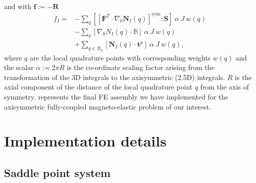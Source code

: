 and with $\mathbf{f} := -\mathbf{R}$
\begin{align}
f_I = &- \sum\limits_q \left[ \left[ \mathbf{F}^T \cdot \nabla_0 \mathbf{N}_I (q) \right]^{\text{sym}} : \mathbf{S} \right] \ \alpha \ J \ w(q) \nonumber \\
&- \sum\limits_{q} \left[ \nabla_0 N_I (q) \cdot \mathbb{B} \right] \ \alpha \ J \ w(q) \nonumber \\
&+ \sum\limits_{q  \in \mathcal{B}_0} \left[ \mathbf{N}_I (q) \cdot \mathbf{t}^p \right] \ \alpha \ J \ w(q),
\label{eq:3.40}
\end{align}
where $q$ are the local quadrature points with corresponding weights $w(q)$ and the scalar $\alpha := 2 \pi R$ is the co-ordinate scaling factor arising from the transformation of the 3D integrals to the axisymmetric (2.5D) integrals. $R$ is the axial component of the distance of the local quadrature point $q$ from the axis of symmetry.  represents the final FE assembly we have implemented for the axisymmetric fully-coupled magneto-elastic problem of our interest. \par 

\section{Implementation details}

\subsection{Saddle point system}

